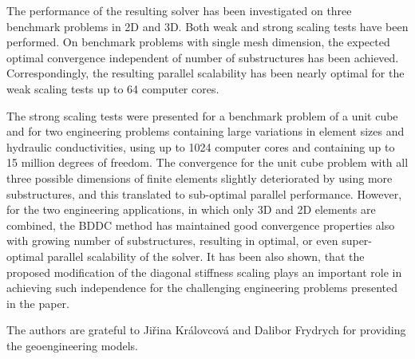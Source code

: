 The performance of the resulting solver has been investigated on three
benchmark problems in 2D and 3D. Both weak and strong scaling tests have been
performed. On benchmark problems with single mesh dimension, 
the expected optimal convergence
independent of number of substructures has been achieved. Correspondingly, the
resulting parallel scalability has been nearly optimal for the weak scaling
tests up to 64 computer cores.

The strong scaling tests were presented for a benchmark problem of a unit cube
and for two engineering problems containing large variations in element sizes
and hydraulic conductivities, using up to 1024 computer cores and containing
up to 15 million degrees of freedom. The convergence for the unit cube problem
with all three possible dimensions of finite elements slightly deteriorated by
using more substructures, and this translated to sub-optimal parallel
performance. However, for the two engineering applications, in which only 3D
and 2D elements are combined, the BDDC method has maintained good convergence
properties also with growing number of substructures, resulting in optimal, or
even super-optimal parallel scalability of the solver. It has been also shown,
that the proposed modification of the diagonal stiffness scaling plays an important role
in achieving such independence for the challenging engineering problems
presented in the paper.

\ack
The authors are grateful to Ji{\v r}ina Kr{\' a}lovcov{\' a} and Dalibor
Frydrych for providing the geoengineering models.





